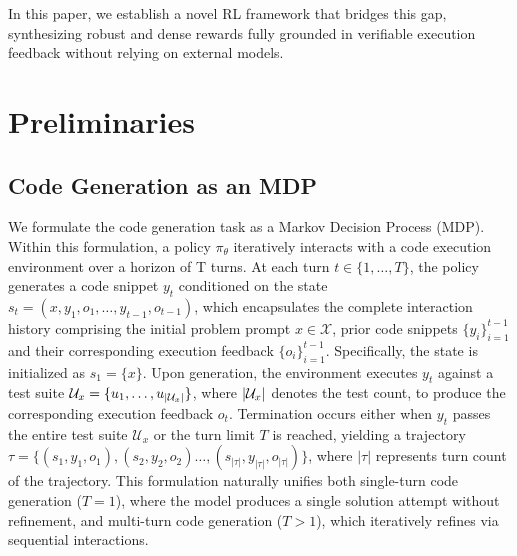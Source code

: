 \documentclass[11pt]{article}
\begin{document}
In this paper, we establish a novel RL framework that bridges this gap, synthesizing robust and dense rewards fully grounded in verifiable execution feedback without relying on external models. 

\section{Preliminaries}
\label{sec:preliminaries}
\subsection{Code Generation as an MDP}\label{MDP}
We formulate the code generation task as a Markov Decision Process (MDP). Within this formulation, a policy $\pi_\theta$ iteratively interacts with a code execution environment over a horizon of T turns. At each turn $t \in \{1, \dots, T\}$, the policy generates a code snippet $y_t$ conditioned on the state $s_t = (x, y_1, o_1, \ldots, y_{t-1}, o_{t-1})$, which encapsulates the complete interaction history comprising the initial problem prompt $x \in \mathcal{X}$, prior code snippets $\{y_i\}_{i=1}^{t-1}$ and their corresponding execution feedback $\{o_i\}_{i=1}^{t-1}$. Specifically, the state is initialized as $s_1 = \{x\}$.  Upon generation, the environment executes $y_t$ against a test suite $\mathcal{U}_x = \{u_1, \dots, u_{\small{|\mathcal{U}_x|}} \}$, where $\small{|\mathcal{U}_x|}$ denotes the test count, to produce the corresponding execution feedback $o_t$. Termination occurs either when $y_t$ passes the entire test suite $\mathcal{U}_x$ or the turn limit $T$ is reached, yielding a trajectory $\tau = \{(s_1, y_1, o_1), (s_2, y_2, o_2) \dots,(s_{|\tau|}, y_{|\tau|}, o_{|\tau|})\}$, where $|\tau|$ represents turn count of the trajectory. This formulation naturally unifies both single-turn code generation ($T=1$), where the model produces a single solution attempt without refinement, and multi-turn code generation ($T > 1$), which iteratively refines via sequential interactions.
\end{document}
